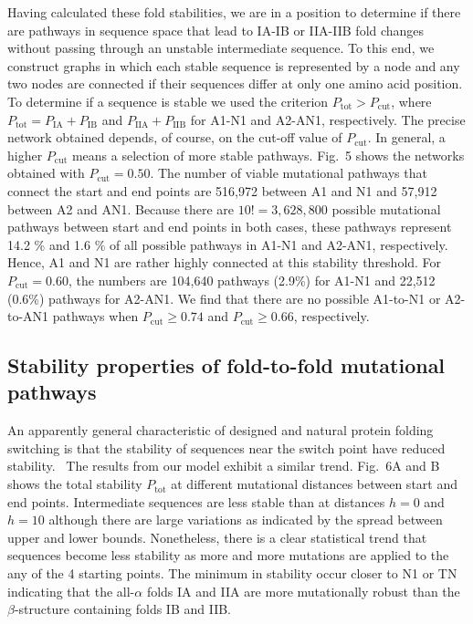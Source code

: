 \documentclass[%
 aip,
rsi,%
 amsmath,amssymb,
 reprint,%
]{revtex4-1}
\newcommand {\Pcut}     	{{P_\mathrm{cut}}}
\newcommand {\Ptot}	{{P_\mathrm{tot}}}
\newcommand {\PaI}    	{{P_\mathrm{IA}}}
\newcommand {\PbI}    	{{P_\mathrm{IB}}}
\newcommand {\PaII}    	{{P_\mathrm{IIA}}}
\newcommand {\PbII}    	{{P_\mathrm{IIB}}}
\begin{document}
Having calculated these fold stabilities, we are in a position to determine if there are pathways in sequence space that lead to IA-IB or IIA-IIB fold changes without passing through an unstable intermediate sequence. To this end, we construct graphs in which each stable sequence is represented by a node and any two nodes are connected if their sequences differ at only one amino acid position. To determine if a sequence is stable we used the criterion $P_\mathrm{tot}>\Pcut$, where  $\Ptot = \PaI + \PbI$ and $\PaII + \PbII$ for A1-N1 and A2-AN1, respectively. The precise network obtained depends, of course, on the cut-off value of $\Pcut$. In general, a higher $\Pcut$ means a selection of more stable pathways. Fig.~5 shows the networks obtained with $\Pcut=0.50$. The number of viable mutational pathways that connect the start and end points are 516,972 between A1 and N1 and  57,912 between A2 and AN1. Because there are $10! =3,628,800$ possible mutational pathways between start and end points in both cases, these pathways represent 14.2 \% and 1.6 \% of all possible pathways in A1-N1 and A2-AN1, respectively. Hence, A1 and N1 are rather highly connected at this stability threshold. For $\Pcut=0.60$, the numbers are 104,640 pathways (2.9\%) for A1-N1 and 22,512 (0.6\%) pathways for A2-AN1. We find that there are no possible A1-to-N1 or A2-to-AN1 pathways when $\Pcut\ge0.74$ and $\Pcut\ge 0.66$, respectively. \\

\subsection{Stability properties of fold-to-fold mutational pathways}
\noindent 
An apparently general characteristic of designed and natural protein folding switching is that the stability of sequences near the switch point have reduced stability.~\cite{Bryan2010} The results from our model exhibit a similar trend. Fig.~6A and B shows the total stability $\Ptot$ at different mutational distances between start and end points. Intermediate sequences are less stable than at distances $h=0$ and $h=10$ although there are large variations as indicated by the spread between upper and lower bounds. Nonetheless, there is a clear statistical trend that sequences become less stability as more and more mutations are applied to the any of the 4 starting points. The minimum in stability occur closer to N1 or TN indicating that the all-$\alpha$ folds IA and IIA are more mutationally robust than the $\beta$-structure containing folds IB and IIB. 
\end{document}
